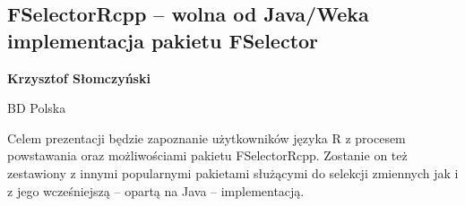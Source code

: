 \documentclass[\main/boa.tex]{subfiles}
\begin{document}
\subsection{FSelectorRcpp – wolna od Java/Weka implementacja pakietu FSelector}

\begin{minipage}{0.915\textwidth}
	\centering
  {\bf {} Krzysztof Słomczyński}
\end{minipage}



\begin{affiliations}
\begin{minipage}{0.915\textwidth}
\centering
BD Polska \\[-2pt]
\end{minipage}
\end{affiliations}

\vskip 0.3cm

Celem prezentacji będzie zapoznanie użytkowników języka R z procesem powstawania oraz możliwościami pakietu FSelectorRcpp. Zostanie on też zestawiony z innymi popularnymi pakietami służącymi do selekcji zmiennych jak i z jego wcześniejszą – opartą na Java – implementacją. 
\end{document}
